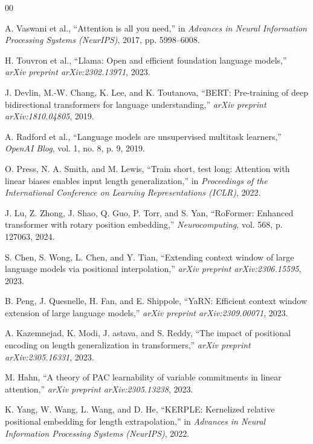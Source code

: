 \documentclass[conference]{IEEEtran}
\begin{document}
\begin{thebibliography}{00}

 A. Vaswani et al., ``Attention is all you need,'' in \emph{Advances in Neural Information Processing Systems (NeurIPS)}, 2017, pp. 5998--6008.

 H. Touvron et al., ``Llama: Open and efficient foundation language models,'' \emph{arXiv preprint arXiv:2302.13971}, 2023.

 J. Devlin, M.-W. Chang, K. Lee, and K. Toutanova, ``BERT: Pre-training of deep bidirectional transformers for language understanding,'' \emph{arXiv preprint arXiv:1810.04805}, 2019.

 A. Radford et al., ``Language models are unsupervised multitask learners,'' \emph{OpenAI Blog}, vol. 1, no. 8, p. 9, 2019.

 O. Press, N. A. Smith, and M. Lewis, ``Train short, test long: Attention with linear biases enables input length generalization,'' in \emph{Proceedings of the International Conference on Learning Representations (ICLR)}, 2022.

 J. Lu, Z. Zhong, J. Shao, Q. Guo, P. Torr, and S. Yan, ``RoFormer: Enhanced transformer with rotary position embedding,'' \emph{Neurocomputing}, vol. 568, p. 127063, 2024.

 S. Chen, S. Wong, L. Chen, and Y. Tian, ``Extending context window of large language models via positional interpolation,'' \emph{arXiv preprint arXiv:2306.15595}, 2023.

 B. Peng, J. Quesnelle, H. Fan, and E. Shippole, ``YaRN: Efficient context window extension of large language models,'' \emph{arXiv preprint arXiv:2309.00071}, 2023.

 A. Kazemnejad, K. Modi, J. astava, and S. Reddy, ``The impact of positional encoding on length generalization in transformers,'' \emph{arXiv preprint arXiv:2305.16331}, 2023.

 M. Hahn, ``A theory of PAC learnability of variable commitments in linear attention,'' \emph{arXiv preprint arXiv:2305.13238}, 2023.

 K. Yang, W. Wang, L. Wang, and D. He, ``KERPLE: Kernelized relative positional embedding for length extrapolation,'' in \emph{Advances in Neural Information Processing Systems (NeurIPS)}, 2022.


\end{thebibliography}
\end{document}
